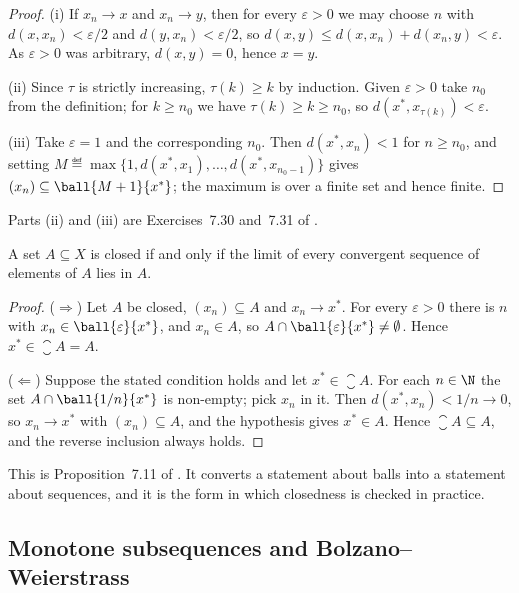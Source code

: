 \begin{proof}
	(i) If $x_n\to x$ and $x_n\to y$, then for every $\varepsilon>0$ we may choose
	$n$ with $d(x,x_n)<\varepsilon/2$ and $d(y,x_n)<\varepsilon/2$, so
	$d(x,y)\leq d(x,x_n)+d(x_n,y)<\varepsilon$. As $\varepsilon>0$ was arbitrary,
	$d(x,y)=0$, hence $x=y$.

	(ii) Since $\tau$ is strictly increasing, $\tau(k)\geq k$ by induction. Given
	$\varepsilon>0$ take $n_0$ from the definition; for $k\geq n_0$ we have
	$\tau(k)\geq k\geq n_0$, so $d(x^\ast,x_{\tau(k)})<\varepsilon$.

	(iii) Take $\varepsilon=1$ and the corresponding $n_0$. Then
	$d(x^\ast,x_n)<1$ for $n\geq n_0$, and setting
	$M\eqdef\max\{1,d(x^\ast,x_1),\dots,d(x^\ast,x_{n_0-1})\}$ gives
	$(x_n)\subseteq\ball{M+1}{x^\ast}$; the maximum is over a finite set and hence
	finite.
\end{proof}

Parts (ii) and (iii) are Exercises~7.30 and~7.31 of
\autocite[slide 43]{fukuda2026analysis}.

\begin{theorem}\label{thm:closed-sequential}
	A set $A\subseteq X$ is closed if and only if the limit of every convergent
	sequence of elements of $A$ lies in $A$.
\end{theorem}

\begin{proof}
	($\Rightarrow$) Let $A$ be closed, $(x_n)\subseteq A$ and $x_n\to x^\ast$. For
	every $\varepsilon>0$ there is $n$ with $x_n\in\ball{\varepsilon}{x^\ast}$, and
	$x_n\in A$, so $A\cap\ball{\varepsilon}{x^\ast}\neq\emptyset$. Hence
	$x^\ast\in\closure A=A$.

	($\Leftarrow$) Suppose the stated condition holds and let
	$x^\ast\in\closure A$. For each $n\in\N$ the set
	$A\cap\ball{1/n}{x^\ast}$ is non-empty; pick $x_n$ in it. Then
	$d(x^\ast,x_n)<1/n\to0$, so $x_n\to x^\ast$ with $(x_n)\subseteq A$, and the
	hypothesis gives $x^\ast\in A$. Hence $\closure A\subseteq A$, and the reverse
	inclusion always holds.
\end{proof}

This is Proposition~7.11 of \textcite{fukuda2026notes}
\autocite[slide 43]{fukuda2026analysis}. It converts a statement about balls into
a statement about sequences, and it is the form in which closedness is checked in
practice.

\subsection{Monotone subsequences and Bolzano--Weierstrass}

